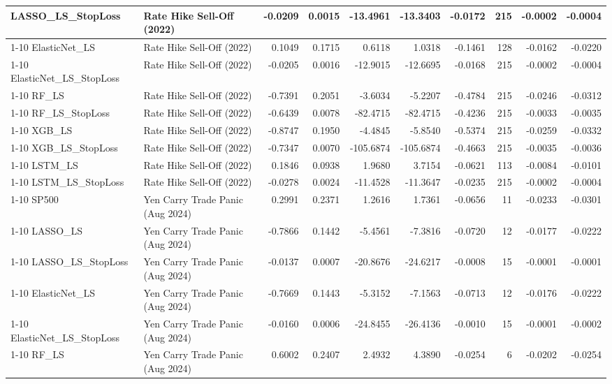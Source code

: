\begin{tabular}{llrrrrrrrr}
LASSO\_LS\_StopLoss & Rate Hike Sell-Off (2022) & -0.0209 & 0.0015 & -13.4961 & -13.3403 & -0.0172 & 215 & -0.0002 & -0.0004 \\
\cline{1-10}
ElasticNet\_LS & Rate Hike Sell-Off (2022) & 0.1049 & 0.1715 & 0.6118 & 1.0318 & -0.1461 & 128 & -0.0162 & -0.0220 \\
\cline{1-10}
ElasticNet\_LS\_StopLoss & Rate Hike Sell-Off (2022) & -0.0205 & 0.0016 & -12.9015 & -12.6695 & -0.0168 & 215 & -0.0002 & -0.0004 \\
\cline{1-10}
RF\_LS & Rate Hike Sell-Off (2022) & -0.7391 & 0.2051 & -3.6034 & -5.2207 & -0.4784 & 215 & -0.0246 & -0.0312 \\
\cline{1-10}
RF\_LS\_StopLoss & Rate Hike Sell-Off (2022) & -0.6439 & 0.0078 & -82.4715 & -82.4715 & -0.4236 & 215 & -0.0033 & -0.0035 \\
\cline{1-10}
XGB\_LS & Rate Hike Sell-Off (2022) & -0.8747 & 0.1950 & -4.4845 & -5.8540 & -0.5374 & 215 & -0.0259 & -0.0332 \\
\cline{1-10}
XGB\_LS\_StopLoss & Rate Hike Sell-Off (2022) & -0.7347 & 0.0070 & -105.6874 & -105.6874 & -0.4663 & 215 & -0.0035 & -0.0036 \\
\cline{1-10}
LSTM\_LS & Rate Hike Sell-Off (2022) & 0.1846 & 0.0938 & 1.9680 & 3.7154 & -0.0621 & 113 & -0.0084 & -0.0101 \\
\cline{1-10}
LSTM\_LS\_StopLoss & Rate Hike Sell-Off (2022) & -0.0278 & 0.0024 & -11.4528 & -11.3647 & -0.0235 & 215 & -0.0002 & -0.0004 \\
\cline{1-10}
SP500 & Yen Carry Trade Panic (Aug 2024) & 0.2991 & 0.2371 & 1.2616 & 1.7361 & -0.0656 & 11 & -0.0233 & -0.0301 \\
\cline{1-10}
LASSO\_LS & Yen Carry Trade Panic (Aug 2024) & -0.7866 & 0.1442 & -5.4561 & -7.3816 & -0.0720 & 12 & -0.0177 & -0.0222 \\
\cline{1-10}
LASSO\_LS\_StopLoss & Yen Carry Trade Panic (Aug 2024) & -0.0137 & 0.0007 & -20.8676 & -24.6217 & -0.0008 & 15 & -0.0001 & -0.0001 \\
\cline{1-10}
ElasticNet\_LS & Yen Carry Trade Panic (Aug 2024) & -0.7669 & 0.1443 & -5.3152 & -7.1563 & -0.0713 & 12 & -0.0176 & -0.0222 \\
\cline{1-10}
ElasticNet\_LS\_StopLoss & Yen Carry Trade Panic (Aug 2024) & -0.0160 & 0.0006 & -24.8455 & -26.4136 & -0.0010 & 15 & -0.0001 & -0.0002 \\
\cline{1-10}
RF\_LS & Yen Carry Trade Panic (Aug 2024) & 0.6002 & 0.2407 & 2.4932 & 4.3890 & -0.0254 & 6 & -0.0202 & -0.0254 \\

\end{tabular}
